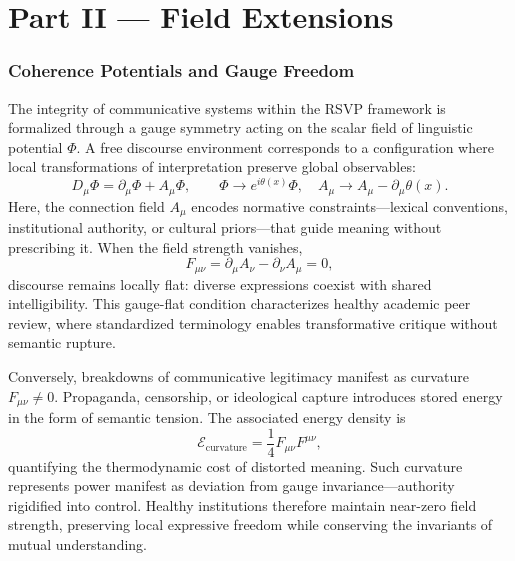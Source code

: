 \documentclass[12pt,a4paper]{article}
\begin{document}
\clearpage
\part{Part II — Field Extensions}

\section{Coherence Potentials and Gauge Freedom}
The integrity of communicative systems within the RSVP framework is formalized through a gauge symmetry acting on the scalar field of linguistic potential $\Phi$. A free discourse environment corresponds to a configuration where local transformations of interpretation preserve global observables:
\begin{equation}
D_\mu \Phi = \partial_\mu \Phi + A_\mu \Phi, \qquad
\Phi \rightarrow e^{i\theta(x)} \Phi, \quad
A_\mu \rightarrow A_\mu - \partial_\mu \theta(x).
\label{eq:gauge-transform}
\end{equation}
Here, the connection field $A_\mu$ encodes normative constraints—lexical conventions, institutional authority, or cultural priors—that guide meaning without prescribing it. When the field strength vanishes,
\begin{equation}
F_{\mu\nu} = \partial_\mu A_\nu - \partial_\nu A_\mu = 0,
\label{eq:flat-field}
\end{equation}
discourse remains locally flat: diverse expressions coexist with shared intelligibility. This gauge-flat condition characterizes healthy academic peer review, where standardized terminology enables transformative critique without semantic rupture.

Conversely, breakdowns of communicative legitimacy manifest as curvature $F_{\mu\nu} \neq 0$. Propaganda, censorship, or ideological capture introduces stored energy in the form of semantic tension. The associated energy density is
\begin{equation}
\mathcal{E}_{\text{curvature}} = \frac{1}{4} F_{\mu\nu} F^{\mu\nu},
\label{eq:curvature-energy}
\end{equation}
quantifying the thermodynamic cost of distorted meaning. Such curvature represents power manifest as deviation from gauge invariance—authority rigidified into control. Healthy institutions therefore maintain near-zero field strength, preserving local expressive freedom while conserving the invariants of mutual understanding.
\end{document}
